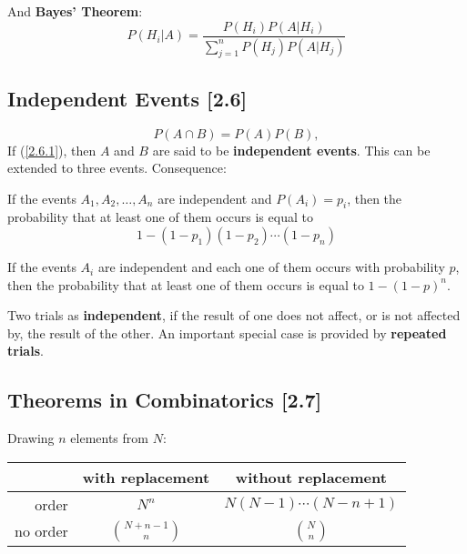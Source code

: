 \documentclass[a4paper,9pt]{extarticle}
\begin{document}
\begin{multicols*}{2}
And \textbf{Bayes' Theorem}:
\begin{equation}
    P(H_i|A) = \frac{P(H_i) P(A|H_i)}{\sum_{j=1}^n P(H_j) P(A|H_j)}
\end{equation}

\subsection{Independent Events [2.6]}
\begin{equation} \label{2.6.1}
    P(A \cap B) = P(A) P(B),
\end{equation}
If (\ref{2.6.1}), then $A$ and $B$ are said to be \textbf{independent events}. This can be extended to three events. Consequence:

If the events $A_1, A_2, \dots, A_n$ are independent and $P(A_i)=p_i$, then the probability that at least one of them occurs is equal to
\begin{equation}
    1 - (1 - p_1)(1 - p_2) \cdots (1 - p_n)
\end{equation}

If the events $A_i$ are independent and each one of them occurs with probability $p$, then the probability that at least one of them occurs is equal to $1 - (1 - p)^n$.

Two trials as \textbf{independent}, if the result of one does not affect, or is not affected by, the result of the other. An important special case is provided by \textbf{repeated trials}.

\subsection{Theorems in Combinatorics [2.7]}
Drawing $n$ elements from $N$:

\begin{tabulary}{1.0\textwidth}{r|c|c}
    & with replacement & without replacement \\ \hline
    order & $N^n$ & $N (N-1) \cdots (N-n+1)$ \\ \hline
    no order & $\binom{N+n-1}{n}$ & $\binom{N}{n}$ \\
\end{tabulary}

\end{multicols*}
\end{document}
